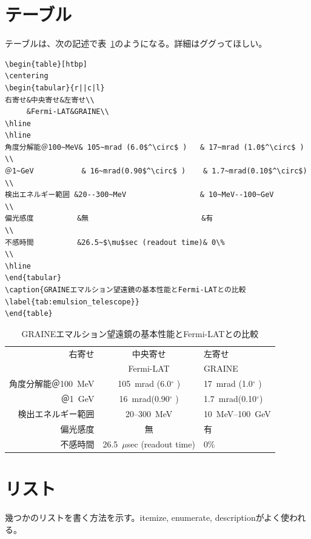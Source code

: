 \documentclass[a4j]{jsarticle}
\begin{document}
\section{テーブル}
テーブルは、次の記述で表~\ref{tab:emulsion_telescope}のようになる。詳細はググってほしい。
\begin{verbatim}
\begin{table}[htbp]
\centering
\begin{tabular}{r||c|l}
右寄せ&中央寄せ&左寄せ\\
     &Fermi-LAT&GRAINE\\
\hline
\hline
角度分解能＠100~MeV& 105~mrad (6.0$^\circ$ )   & 17~mrad (1.0$^\circ$ ) \\
＠1~GeV           & 16~mrad(0.90$^\circ$ )    & 1.7~mrad(0.10$^\circ$) \\
検出エネルギー範囲 &20--300~MeV                 & 10~MeV--100~GeV        \\
偏光感度          &無                          &有                      \\
不感時間          &26.5~$\mu$sec (readout time)& 0\%                    \\
\hline
\end{tabular}
\caption{GRAINEエマルション望遠鏡の基本性能とFermi-LATとの比較\label{tab:emulsion_telescope}}
\end{table}
\end{verbatim}
\begin{table}[htbp]
\centering
\begin{tabular}{r||c|l}
右寄せ&中央寄せ&左寄せ\\
     &Fermi-LAT&GRAINE\\
\hline
\hline
角度分解能＠100~MeV& 105~mrad (6.0$^\circ$ )   & 17~mrad (1.0$^\circ$ ) \\
＠1~GeV           & 16~mrad(0.90$^\circ$ )    & 1.7~mrad(0.10$^\circ$) \\
検出エネルギー範囲 &20--300~MeV                 & 10~MeV--100~GeV        \\
偏光感度          &無                          &有                      \\
不感時間          &26.5~$\mu$sec (readout time)& 0\%                    \\
\hline
\end{tabular}
\caption{GRAINEエマルション望遠鏡の基本性能とFermi-LATとの比較\label{tab:emulsion_telescope}}
\end{table}

\newpage
\section{リスト}
幾つかのリストを書く方法を示す。itemize, enumerate, descriptionがよく使われる。
\end{document}
